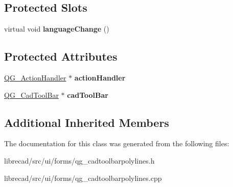 \subsection*{Protected Slots}
\begin{DoxyCompactItemize}
\item 
\hypertarget{classQG__CadToolBarPolylines_a566e1e92bbcd316e70f3cf1c4452e421}{virtual void {\bfseries language\-Change} ()}\label{classQG__CadToolBarPolylines_a566e1e92bbcd316e70f3cf1c4452e421}

\end{DoxyCompactItemize}
\subsection*{Protected Attributes}
\begin{DoxyCompactItemize}
\item 
\hypertarget{classQG__CadToolBarPolylines_aadbda2cf79ef537d34db08e44b9633ac}{\hyperlink{classQG__ActionHandler}{Q\-G\-\_\-\-Action\-Handler} $\ast$ {\bfseries action\-Handler}}\label{classQG__CadToolBarPolylines_aadbda2cf79ef537d34db08e44b9633ac}

\item 
\hypertarget{classQG__CadToolBarPolylines_a1b4b7d2879eaf82e95ea6d282ed99a25}{\hyperlink{classQG__CadToolBar}{Q\-G\-\_\-\-Cad\-Tool\-Bar} $\ast$ {\bfseries cad\-Tool\-Bar}}\label{classQG__CadToolBarPolylines_a1b4b7d2879eaf82e95ea6d282ed99a25}

\end{DoxyCompactItemize}
\subsection*{Additional Inherited Members}


The documentation for this class was generated from the following files\-:\begin{DoxyCompactItemize}
\item 
librecad/src/ui/forms/qg\-\_\-cadtoolbarpolylines.\-h\item 
librecad/src/ui/forms/qg\-\_\-cadtoolbarpolylines.\-cpp\end{DoxyCompactItemize}
